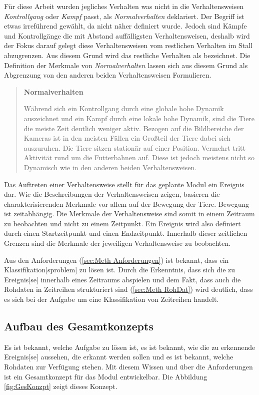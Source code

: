 Für diese Arbeit wurden jegliches Verhalten was nicht in die Verhaltensweisen \textit{Kontrollgang} oder \textit{Kampf} passt, als \textit{Normalverhalten} deklariert. Der Begriff ist etwas irreführend gewählt, da  nicht näher definiert wurde. Jedoch sind Kämpfe und Kontrollgänge die mit Abstand auffälligsten Verhaltensweisen, deshalb wird der Fokus darauf gelegt diese Verhaltensweisen vom restlichen Verhalten im Stall abzugrenzen. Aus diesem Grund wird das restliche Verhalten als  bezeichnet. Die Definition der Merkmale von \textit{Normalverhalten} lassen sich aus diesem Grund als Abgrenzung von den anderen beiden Verhaltensweisen Formulieren.\dubpar

\begin{quote}
\textbf{Normalverhalten}\par
Während sich ein Kontrollgang durch eine globale hohe Dynamik auszeichnet und ein Kampf durch eine lokale hohe Dynamik, sind die Tiere die meiste Zeit deutlich weniger aktiv. Bezogen auf die Bildbereiche der Kameras ist in den meisten Fällen ein Großteil der Tiere dabei sich auszuruhen. Die Tiere sitzen stationär auf einer Position. Vermehrt tritt Aktivität rund um die Futterbahnen auf. Diese ist jedoch meistens nicht so Dynamisch wie in den anderen beiden Verhaltensweisen.
\end{quote}
\par

Das Auftreten einer Verhaltensweise stellt für das geplante \gls{Modul} ein \gls{Ereignis} dar. Wie die Beschreibungen der Verhaltensweisen zeigen, basieren die charakterisierenden Merkmale vor allem auf der Bewegung der Tiere. Bewegung ist zeitabhängig. Die Merkmale der Verhaltensweise sind somit in einem Zeitraum zu beobachten und nicht zu einem Zeitpunkt. Ein \gls{Ereignis} wird also definiert durch einen Startzeitpunkt und einen Endzeitpunkt. Innerhalb dieser zeitlichen Grenzen sind die Merkmale der jeweiligen Verhaltensweise zu beobachten. \par

Aus den Anforderungen (\ref{sec:Meth Anforderungen}) ist bekannt, dass ein \gls{Klassifikation}[sproblem] zu lösen ist. Durch die Erkenntnis, dass sich die zu \gls{Ereignis}[se] innerhalb eines Zeitraums abspielen und dem Fakt, dass auch die Rohdaten in Zeitreihen strukturiert sind (\ref{sec:Meth RohDat}) wird deutlich, dass es sich bei der Aufgabe um eine \gls{Klassifikation} von Zeitreihen handelt.\par

\subsection{Aufbau des Gesamtkonzepts}
Es ist bekannt, welche Aufgabe zu lösen ist, es ist bekannt, wie die zu erkennende \gls{Ereignis}[se] aussehen, die erkannt werden sollen und es ist bekannt, welche Rohdaten zur Verfügung stehen. Mit diesem Wissen und über die Anforderungen ist ein Gesamtkonzept für das \gls{Modul} entwickelbar. Die Abbildung \ref{fig:GesKonzpt} zeigt dieses Konzept.

